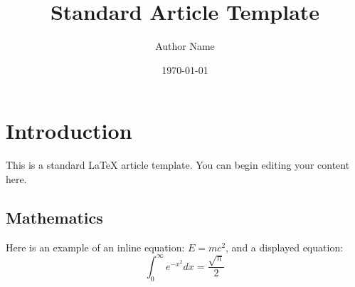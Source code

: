\documentclass{article}
\title{Standard Article Template}
\author{Author Name}
\date{\today}
\begin{document}
\maketitle

\section{Introduction}
This is a standard LaTeX article template. You can begin editing your content here.

\subsection{Mathematics}
Here is an example of an inline equation: $E = mc^2$, and a displayed equation:
\[ \int_0^\infty e^{-x^2} dx = \frac{\sqrt{\pi}}{2} \]
\end{document}
